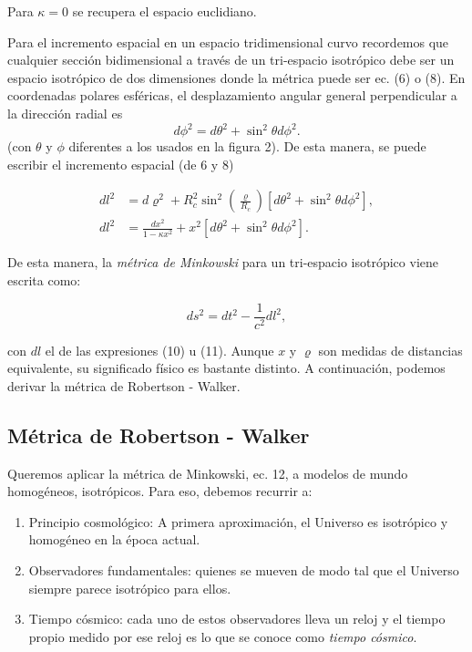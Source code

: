 \documentclass[11pt]{article}
\begin{document}
Para $\kappa = 0$ se recupera el espacio euclidiano.

Para el incremento espacial en un espacio tridimensional curvo recordemos que cualquier sección bidimensional a través de un tri-espacio isotrópico debe ser un espacio isotrópico de dos dimensiones donde la métrica puede ser ec. (6) o (8). En coordenadas polares esféricas, el desplazamiento angular general perpendicular a la dirección radial es 
\begin{equation}
    d\phi^2 = d\theta^2 +  \sin^2 \theta d\phi^2.
\end{equation}
 (con $\theta$ y $\phi$ diferentes a los usados en la figura 2). De esta manera, se puede escribir el incremento espacial (de 6 y 8) 


\begin{align}
        dl^2 & = d\varrho^2 + R_c^2 \sin^2\left(\frac{\varrho}{R_c} \right) [d\theta^2 +  \sin^2 \theta d\phi^2], \\
        dl^2 &  =  \frac{dx^2}{1-\kappa x^2} + x^2[d\theta^2 +  \sin^2 \theta d\phi^2].
\end{align}

De esta manera, la {\textit{métrica de Minkowski}} para un tri-espacio isotrópico viene escrita como: 

\begin{equation}
    ds^2 = dt^2 - \frac{1}{c^2} dl^2,
\end{equation}

con $dl$ el de las expresiones (10) u (11). Aunque $x$ y $\varrho$ son medidas de distancias equivalente, su significado físico es bastante distinto. A continuación, podemos derivar la métrica de Robertson -  Walker. 


\subsection{Métrica de Robertson - Walker}

Queremos aplicar la métrica de Minkowski, ec. 12, a modelos de mundo homogéneos, isotrópicos. Para eso, debemos recurrir a:

    \begin{enumerate}
        \item Principio cosmológico: A primera aproximación, el Universo es isotrópico y homogéneo en la época actual.
        \item Observadores fundamentales: quienes se mueven de modo tal que el Universo siempre parece isotrópico para ellos. 
        \item Tiempo cósmico: cada uno de estos observadores lleva un reloj y el tiempo propio medido por ese reloj es lo que se conoce como {\textit{tiempo cósmico}}.
    \end{enumerate}
    
\end{document}
